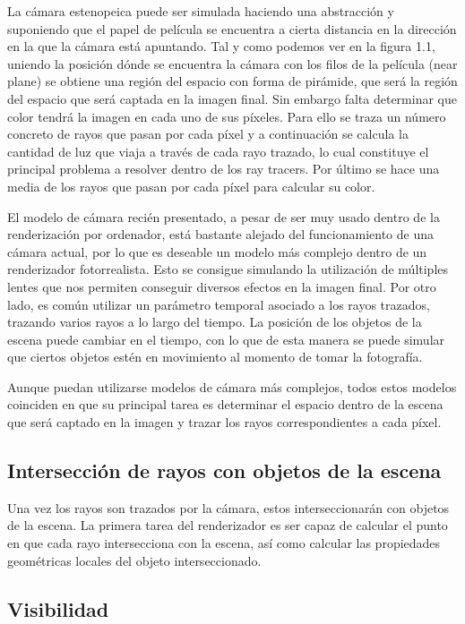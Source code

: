 La cámara estenopeica puede ser simulada haciendo una abstracción y suponiendo que el papel de película se encuentra a cierta distancia en la dirección en la que la cámara está apuntando. Tal y como podemos ver en la figura 1.1, uniendo la posición dónde se encuentra la cámara con los filos de la película (near plane) se obtiene una región del espacio con forma de pirámide, que será la región del espacio que será captada en la imagen final. Sin embargo falta determinar que color tendrá la imagen en cada uno de sus píxeles. Para ello se traza un número concreto de rayos que pasan por cada píxel y a continuación se calcula la cantidad de luz que viaja a través de cada rayo trazado, lo cual constituye el principal problema a resolver dentro de los ray tracers. Por último se hace una media de los rayos que pasan por cada píxel para calcular su color.

El modelo de cámara recién presentado, a pesar de ser muy usado dentro de la renderización por ordenador, está bastante alejado del funcionamiento de una cámara actual, por lo que es deseable un modelo más complejo dentro de un renderizador fotorrealista. Esto se consigue simulando la utilización de múltiples lentes que nos permiten conseguir diversos efectos en la imagen final. Por otro lado, es común utilizar un parámetro temporal asociado a los rayos trazados, trazando varios rayos a lo largo del tiempo. La posición de los objetos de la escena puede cambiar en el tiempo, con lo que de esta manera se puede simular que ciertos objetos estén en movimiento al momento de tomar la fotografía. 


Aunque puedan utilizarse modelos de cámara más complejos, todos estos modelos coinciden en que su principal tarea es determinar el espacio dentro de la escena que será captado en la imagen y trazar los rayos correspondientes a cada píxel.

\subsection{Intersección de rayos con objetos de la escena}

Una vez los rayos son trazados por la cámara, estos interseccionarán con objetos de la escena. La primera tarea del renderizador es ser capaz de calcular el punto en que cada rayo intersecciona con la escena, así como calcular las propiedades geométricas locales del objeto interseccionado.

\subsection{Visibilidad}

